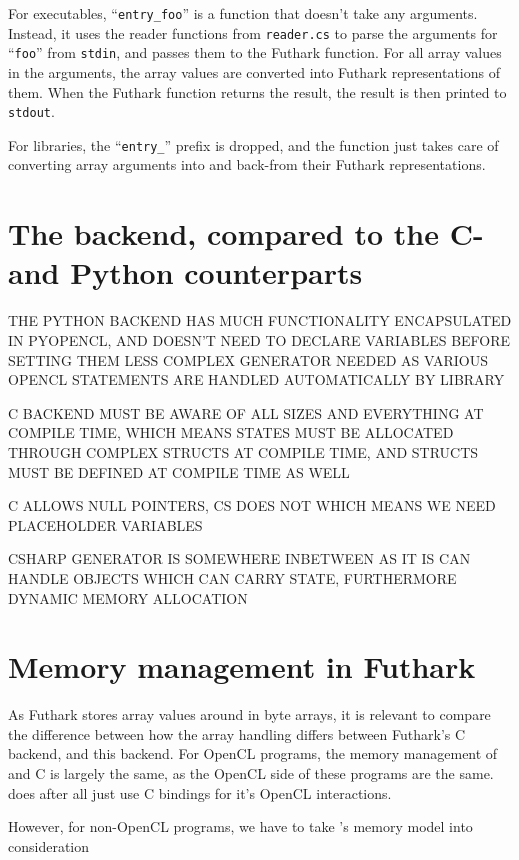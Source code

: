 For executables, ``\texttt{entry\_foo}'' is a function that doesn't take any
arguments. Instead, it uses the reader functions from \texttt{reader.cs} to parse the
arguments for ``\texttt{foo}'' from \texttt{stdin}, and passes them to the
Futhark function. For all array values in the arguments, the array values are
converted into Futhark representations of them.
When the Futhark function returns the result, the result is then printed to \texttt{stdout}.

For libraries, the ``\texttt{entry\_}'' prefix is dropped, and the function
just takes care of converting array arguments into and back-from their Futhark
representations.

\clearpage

\section*{The \csharp{} backend, compared to the C- and Python counterparts}

THE PYTHON BACKEND HAS MUCH FUNCTIONALITY ENCAPSULATED IN PYOPENCL, AND DOESN'T
NEED TO DECLARE VARIABLES BEFORE SETTING THEM
LESS COMPLEX GENERATOR NEEDED AS VARIOUS OPENCL STATEMENTS ARE HANDLED
AUTOMATICALLY BY LIBRARY

C BACKEND MUST BE AWARE OF ALL SIZES AND EVERYTHING AT COMPILE TIME, WHICH MEANS
STATES MUST BE ALLOCATED THROUGH COMPLEX STRUCTS AT COMPILE TIME, AND STRUCTS
MUST BE DEFINED AT COMPILE TIME AS WELL

C ALLOWS NULL POINTERS, CS DOES NOT WHICH MEANS WE NEED PLACEHOLDER VARIABLES

CSHARP GENERATOR IS SOMEWHERE INBETWEEN AS IT IS CAN HANDLE OBJECTS WHICH CAN
CARRY STATE, FURTHERMORE DYNAMIC MEMORY ALLOCATION

\section*{Memory management in Futhark \csharp{}}
As Futhark stores array values around in byte arrays, it is relevant to compare
the difference between how the array handling differs between Futhark's C
backend, and this \csharp{} backend.
For OpenCL programs, the memory management of \csharp{} and C is largely the
same, as the OpenCL side of these programs are the same. \csharp{} does after
all just use C bindings for it's OpenCL interactions.

However, for non-OpenCL \csharp{} programs, we have to take \csharp{}'s memory
model into consideration

